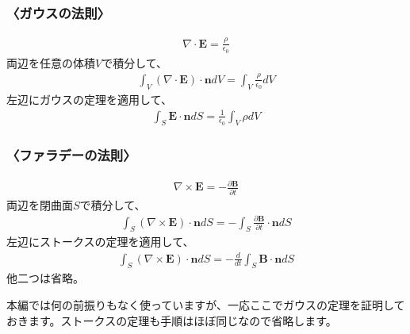 \documentclass[10pt,b5paper,papersize,dvipdfmx]{jsbook}
\begin{document}
\subsubsection{〈ガウスの法則〉}
\begin{align}
\nabla\cdot\mathbf{E} = \frac{\rho}{\epsilon_0}
\end{align}
両辺を任意の体積$V$で積分して、
\begin{align}
\int_V (\nabla\cdot\mathbf{E})\cdot\mathbf{n}dV=\int_V \frac{\rho}{\epsilon_0}dV
\end{align}
左辺にガウスの定理を適用して、
\begin{align}
\int_S \mathbf{E}\cdot \mathbf{n} dS = \frac{1}{\epsilon_0} \int_V \rho dV
\end{align}

\subsubsection{〈ファラデーの法則〉}
\begin{align}
\nabla\times\mathbf{E} = -\frac{\partial\mathbf{B}}{\partial t}
\end{align}
両辺を閉曲面$S$で積分して、
\begin{align}
\int_S (\nabla\times\mathbf{E})\cdot\mathbf{n}dS = -\int_S \frac{\partial\mathbf{B}}{\partial t}\cdot\mathbf{n}dS
\end{align}
左辺にストークスの定理を適用して、
\begin{align}
\int_S (\nabla\times\mathbf{E})\cdot\mathbf{n} dS = -\frac{d}{dt}\int_S \mathbf{B}\cdot \mathbf{n} dS
\end{align}
他二つは省略。
\par
\par
本編では何の前振りもなく使っていますが、一応ここでガウスの定理を証明しておきます。ストークスの定理も手順はほぼ同じなので省略します。
\end{document}
